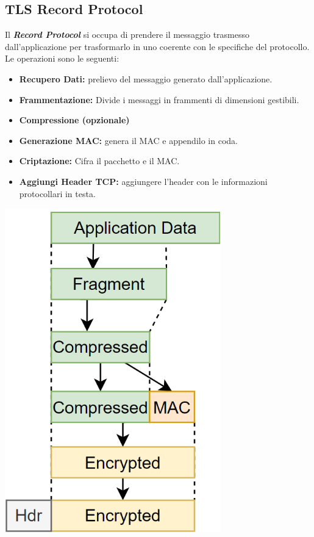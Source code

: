 \subsection{TLS Record Protocol}
Il \textbf{\textit{Record Protocol}} si occupa di prendere il messaggio trasmesso dall'applicazione per trasformarlo in uno coerente con le specifiche del protocollo. Le operazioni sono le seguenti:


\noindent\begin{minipage}{0.6\textwidth}
\vspace{4pt}
\begin{theorem}\label{thm:recordprotocolsnd}
\begin{itemize}
    \item \textbf{Recupero Dati:} prelievo del messaggio generato dall'applicazione.
    \item \textbf{Frammentazione:} Divide i messaggi in frammenti di dimensioni gestibili.
    \item \textbf{Compressione (opzionale)}
    \item \textbf{Generazione MAC:} genera il MAC e appendilo in coda.
    \item \textbf{Criptazione:} Cifra il pacchetto e il MAC.
    \item \textbf{Aggiungi Header TCP:} aggiungere l'header con le informazioni protocollari in testa.
\end{itemize}
\end{theorem}
\end{minipage}
\hspace{0.05\textwidth}
\begin{minipage}{0.4\textwidth}\vspace{4pt}
\centering
\includegraphics[width=0.7\textwidth]{image/tlsrecord.png}
\label{fig:tlsrecord}
\end{minipage}
